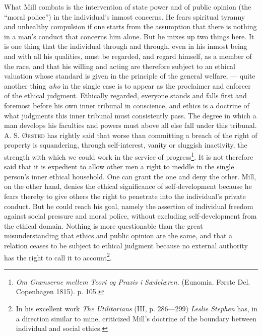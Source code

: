 \documentclass[12pt,a4paper,openany]{book}
\newcommand{\opage}[1]{\marginnote{\footnotesize\textit{[#1]}}}
\begin{document}
What Mill combats is the intervention of state power and of public opinion (the ``moral police'') in the
individual's inmost concerns. He fears spiritual tyranny and unhealthy compulsion if one starts from the
assumption that there is nothing in a man's conduct that concerns him alone. But he mixes up two things here. It
is one thing that the individual through and through, even in his inmost being and with all his qualities, must
be regarded, and regard himself, as a member of the race, and that his willing and acting are therefore subject
to an ethical valuation whose standard is given in the principle of the general welfare, --- quite another thing
\textit{who} in the single case is to appear as the proclaimer and enforcer of the ethical judgment. Ethically
regarded, everyone stands and falls first and foremost before his own inner tribunal in conscience, and ethics
is a doctrine of what judgments this inner tribunal must consistently pass. The degree in which a man develops
his faculties and powers must above all else fall under this tribunal. A. S. \textsc{Ørsted}
\opage{171}has rightly said that worse than committing a breach of the right of property is squandering, through
self-interest, vanity or sluggish inactivity, the strength with which we could work in the service of
progress\footnote[1]{\textit{Om Grænserne mellem Teori og Praxis i Sædelæren.} (Eunomia. Første Del.
Copenhagen 1815). p. 105.}. It is not therefore said that it is expedient to allow other men a right to meddle
in the single person's inner ethical household. One can grant the one and deny the other. Mill, on the other
hand, denies the ethical significance of self-development because he fears thereby to give others the right to
penetrate into the individual's private conduct. But he could reach his goal, namely the assertion of individual
freedom against social pressure and moral police, without excluding self-development from the ethical domain.
Nothing is more questionable than the great misunderstanding that ethics and public opinion are the same, and
that a relation ceases to be subject to ethical judgment because no external authority has the right to call it
to account\footnote[2]{In his excellent work \textit{The Utilitarians} (III, p. 286---299) \emph{Leslie
Stephen} has, in a direction similar to mine, criticized Mill's doctrine of the boundary between individual and
social ethics.}.
\end{document}
